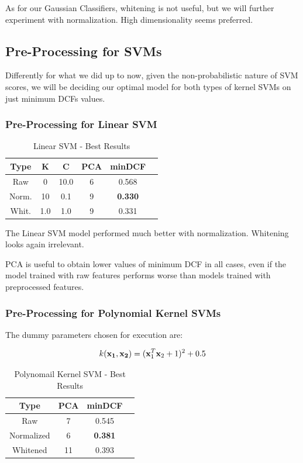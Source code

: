 \documentclass[hidelinks, 12pt, twocolumn]{article}
\begin{document}
As for our Gaussian Classifiers, whitening is not useful, but we will further experiment with normalization.
High dimensionality seems preferred.

\subsection{Pre-Processing for SVMs}

Differently for what we did up to now, given the non-probabilistic nature of SVM scores,
we will be deciding our optimal model for both types of kernel SVMs on just minimum DCFs values.

\subsubsection{Pre-Processing for Linear SVM}

\begin{table}[H]
    \centering
        \begin{tabular}{||c|c|c|c|c|c||}
            \hline
            Type & K & C & PCA  & minDCF \\
            \hline
            \hline
            Raw & 0 & 10.0 & 6 & 0.568  \\
            Norm. & 10 & 0.1 & 9 &  {\bf 0.330}  \\
            Whit. & 1.0 & 1.0 & 9 &  0.331  \\
            \hline
    \end{tabular}
    \caption{Linear SVM - Best Results}
\end{table}

The Linear SVM model performed much better with normalization.
Whitening looks again irrelevant.

PCA is useful to obtain lower values of minimum DCF in all cases, even if the model trained
with raw features performs worse than models trained with preprocessed features.

\subsubsection{Pre-Processing for Polynomial Kernel SVMs}

The dummy parameters chosen for execution are:

$$k({\bf x_1}, {\bf x_2}) = ({\bf x}_1^T{\bf x}_2+1)^2+0.5 $$

\begin{table}[H]
    \centering
        \begin{tabular}{||c|c|c|c||}
            \hline
            Type & PCA & minDCF \\
            \hline
            \hline
            Raw & 7 & 0.545  \\
            Normalized & 6 & {\bf 0.381}  \\
            Whitened & 11 & 0.393  \\
            \hline
        \end{tabular}
        \caption{Polynomail Kernel SVM - Best Results}
        \label{polypreprocessing}
\end{table}
\end{document}

